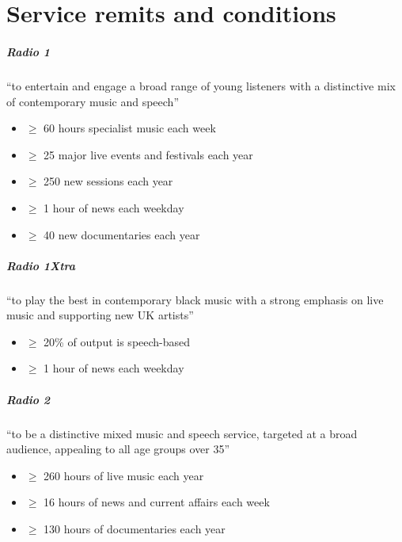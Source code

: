\chapter{Service remits and conditions}\label{app:remit}

\paragraph{Radio 1}
``to entertain and engage a broad range of young listeners with a distinctive
mix of contemporary music and speech''

\begin{itemize}
  \item $\geq$ 60 hours specialist music each week
  \item $\geq$ 25 major live events and festivals each year
  \item $\geq$ 250 new sessions each year
  \item $\geq$ 1 hour of news each weekday
  \item $\geq$ 40 new documentaries each year
\end{itemize} 

\paragraph{Radio 1Xtra}
``to play the best in contemporary black music with a strong emphasis on live
music and supporting new UK artists''

\begin{itemize}
  \item $\geq$ 20\% of output is speech-based
  \item $\geq$ 1 hour of news each weekday
\end{itemize}

\paragraph{Radio 2}
``to be a distinctive mixed music and speech service, targeted at a broad
audience, appealing to all age groups over 35''

\begin{itemize}
  \item $\geq$ 260 hours of live music each year
  \item $\geq$ 16 hours of news and current affairs each week
  \item $\geq$ 130 hours of documentaries each year
\end{itemize}

